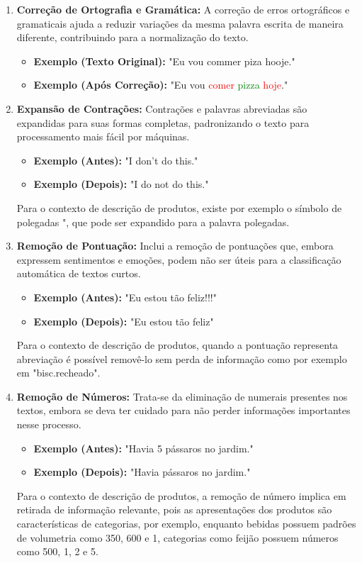 \begin{enumerate}
    \item \textbf{Correção de Ortografia e Gramática:} A correção de erros ortográficos e gramaticais ajuda a reduzir variações da mesma palavra escrita de maneira diferente, contribuindo para a normalização do texto.
    \begin{itemize}
        \item \textbf{Exemplo (Texto Original):} "Eu vou commer piza hooje."
        \item \textbf{Exemplo (Após Correção):} "Eu vou \textcolor{red}{comer} \textcolor{green}{pizza} \textcolor{red}{hoje}."
    \end{itemize}

    \item \textbf{Expansão de Contrações:} Contrações e palavras abreviadas são expandidas para suas formas completas, padronizando o texto para processamento mais fácil por máquinas.
    \begin{itemize}
        \item \textbf{Exemplo (Antes):} "I don't do this."
        \item \textbf{Exemplo (Depois):} "I do not do this."
    \end{itemize}
    Para o contexto de descrição de produtos, existe por exemplo o símbolo de polegadas ", que pode ser expandido para a palavra polegadas.

    \item \textbf{Remoção de Pontuação:} Inclui a remoção de pontuações que, embora expressem sentimentos e emoções, podem não ser úteis para a classificação automática de textos curtos.
    \begin{itemize}
        \item \textbf{Exemplo (Antes):} "Eu estou tão feliz!!!"
        \item \textbf{Exemplo (Depois):} "Eu estou tão feliz"
    \end{itemize}
    Para o contexto de descrição de produtos, quando a pontuação representa abreviação é possível removê-lo sem perda de informação como por exemplo em "bisc.recheado".

    \item \textbf{Remoção de Números:} Trata-se da eliminação de numerais presentes nos textos, embora se deva ter cuidado para não perder informações importantes nesse processo.
    \begin{itemize}
        \item \textbf{Exemplo (Antes):} "Havia 5 pássaros no jardim."
        \item \textbf{Exemplo (Depois):} "Havia pássaros no jardim."
    \end{itemize}
    Para o contexto de descrição de produtos, a remoção de número implica em retirada de informação relevante, pois as apresentações dos produtos são características de categorias, por exemplo, enquanto bebidas possuem padrões de volumetria como 350, 600 e 1, categorias como feijão possuem números como 500, 1, 2 e 5.  


\end{enumerate}
